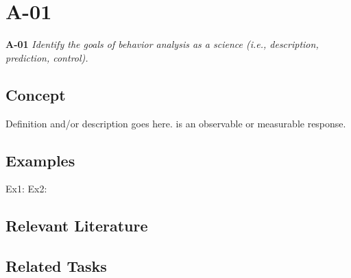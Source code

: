 \chapter{A-01}
{\Large{\textbf{A-01} \textit{Identify the goals of behavior analysis as a science (i.e., description, prediction, control).}}}


\section{Concept}
Definition and/or description goes here.
\lipsum[1-4]
is an observable or measurable response.

\section{Examples}
Ex1: \lipsum[1-3]
Ex2: \lipsum[1-3]

\section{Relevant Literature}

%
\nocite{test}
\printbibliography[heading=none]
\section{Related Tasks}
\lipsum[1-2]
